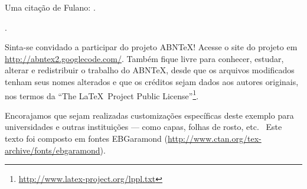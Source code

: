 \documentclass[
	10pt,				%
	openright,			%
	twoside,			%
	a5paper,			%
	english,			%
	french,				%
	spanish,			%
	brazil,				%
]{abntex2}
\begin{document}
Uma citação de Fulano: .

\cite{fulano}.



\backmatter %

\cleardoublepage
\thispagestyle{empty} 

Sinta-se convidado a participar do projeto ABN\TeX! Acesse o site do projeto em
\url{http://abntex2.googlecode.com/}. Também fique livre para conhecer, estudar,
alterar e redistribuir o trabalho do ABN\TeX, desde que os arquivos modificados
tenham seus nomes alterados e que os créditos sejam dados aos autores originais,
nos termos da ``The \LaTeX\ Project Public
License''\footnote{\url{http://www.latex-project.org/lppl.txt}}.

Encorajamos que sejam realizadas customizações específicas deste exemplo para
universidades e outras instituições --- como capas, folhas de rosto, etc.
~\vfill Este texto foi composto em fontes EBGara­mond
(\url{http://www.ctan.org/tex-archive/fonts/ebgaramond}).
\end{document}
